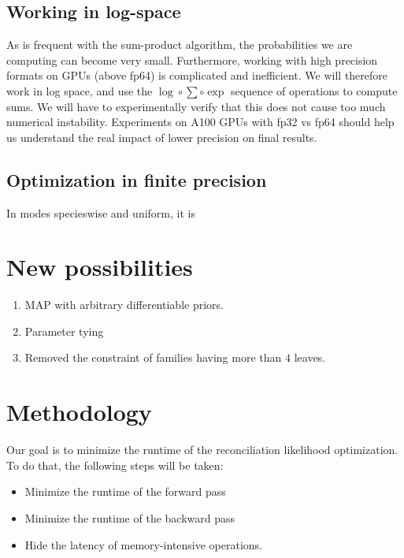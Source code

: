 \documentclass{article}
\newcommand{\1}{\mathbf{1}}
\begin{document}
\subsection{Working in log-space}
As is frequent with the sum-product algorithm, the probabilities we are computing can become very small. Furthermore, working with high precision formats on GPUs (above fp64) is complicated and inefficient. We will therefore work in log space, and use the $\log \circ \sum \circ \exp$ sequence of operations to compute sums. We will have to experimentally verify that this does not cause too much numerical instability. Experiments on A100 GPUs with fp32 vs fp64 should help us understand the real impact of lower precision on final results.

\subsection{Optimization in finite precision}
In modes specieswise and uniform, it is 

\section{New possibilities}
\begin{enumerate}
    \item MAP with arbitrary differentiable priors.
    \item Parameter tying
    \item Removed the constraint of families having more than $4$ leaves.
\end{enumerate}

\section{Methodology}
Our goal is to minimize the runtime of the reconciliation likelihood optimization. To do that, the following steps will be taken:
\begin{itemize}
    \item Minimize the runtime of the forward pass
    \item Minimize the runtime of the backward pass
    \item Hide the latency of memory-intensive operations.
\end{itemize}
\end{document}
